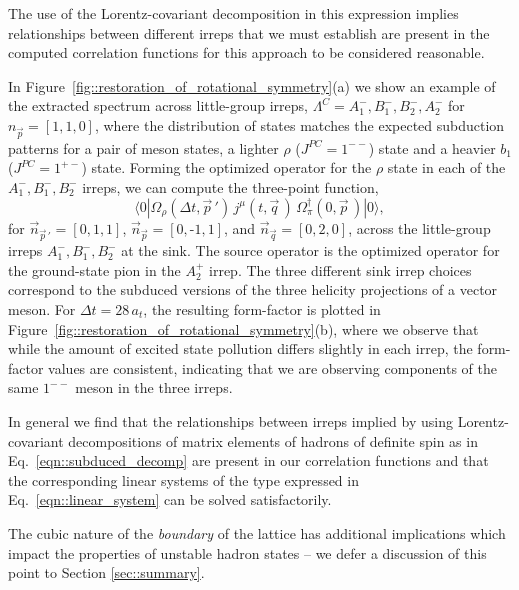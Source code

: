 \documentclass[twocolumn,amsmath,amssymb,prd,10pt,floatfix, 
superscriptaddress,nofootinbib, showpacs, preprintnumbers]{revtex4-1}
\begin{document}
The use of the Lorentz-covariant decomposition in this expression implies relationships between different irreps that we must establish are present in the computed correlation functions for this approach to be considered reasonable. 

In Figure~\ref{fig::restoration_of_rotational_symmetry}(a) we show an example of the extracted spectrum across little-group irreps, ${\Lambda^C = A_1^-, B_1^-, B_2^-, A_2^-}$ for ${n_{\vec{p}}=[1,1,0]}$, where the distribution of states matches the expected subduction patterns for a pair of meson states, a lighter $\rho$ ($J^{PC}=1^{--}$) state and a heavier $b_1$ ($J^{PC}=1^{+-}$) state. Forming the optimized operator for the $\rho$ state in each of the $A_1^-, B_1^-, B_2^-$ irreps, we can compute the three-point function, 
\begin{equation*}
\langle 0 | \Omega_\rho(\Delta t,\vec{p}\,')\,  j^\mu(t,\vec{q}\,) \,  \Omega_\pi^\dagger(0,\vec{p}\,) | 0 \rangle,
\end{equation*}
for $\vec{n}_{\vec{p}\,'} = [0,1,1]$, $\vec{n}_{\vec{p}} = [0,\text{-}1,1]$, and $\vec{n}_{\vec{q}} = [0,2,0]$,  across the little-group irreps $A_1^-, B_1^-, B_2^-$ at the sink. The source operator is the optimized operator for the ground-state pion in the $A_2^+$ irrep. The three different sink irrep choices correspond to the subduced versions of the three helicity projections of a vector meson. For $\Delta t = 28\,  a_t$, the resulting form-factor is plotted in Figure~\ref{fig::restoration_of_rotational_symmetry}(b), where we observe that while the amount of excited state pollution differs slightly in each irrep, the form-factor values are consistent, indicating that we are observing components of the same $1^{--}$ meson in the three irreps. 


In general we find that the relationships between irreps implied by using Lorentz-covariant decompositions of matrix elements of hadrons of definite spin as in Eq.~\ref{eqn::subduced_decomp} are present in our correlation functions and that the corresponding linear systems of the type expressed in Eq.~\ref{eqn::linear_system} can be solved satisfactorily.  

The cubic nature of the \emph{boundary} of the lattice has additional implications which impact the properties of unstable hadron states -- we defer a discussion of this point to Section \ref{sec::summary}.
\end{document}
